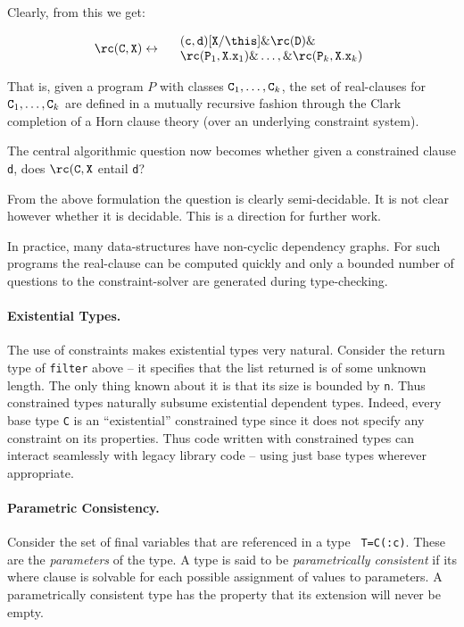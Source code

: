 \noindent Clearly, from this we get:

$$\rc({\tt C},{\tt X}) \leftrightarrow 
\begin{array}{l}
\quad ({\tt c},{\tt d})[{\tt X}/\this] \&   \rc({\tt D}) \& \\
\quad \rc({\tt P}_1, {\tt X.x}_1)\& \ldots, \& \rc({\tt P}_k, {\tt X.x}_k)
\end{array}
$$
  
That is, given a program $P$ with classes ${\tt C}_1,\ldots, {\tt
C}_k$, the set of real-clauses for ${\tt C}_1,\ldots, {\tt C}_k$ are
defined in a mutually recursive fashion through the Clark completion
of a Horn clause theory (over an underlying constraint system).

The central algorithmic question now becomes whether given a
constrained clause {\tt d}, does $\rc({\tt C},{\tt X}$ entail {\tt d}? 

From the above formulation the question is clearly semi-decidable. It
is not clear however whether it is decidable. This is a direction for
further work.

In practice, many data-structures have non-cyclic dependency
graphs. For such programs the real-clause can be computed quickly and
only a bounded number of questions to the constraint-solver are
generated during type-checking.

\paragraph{Existential Types.}
The use of constraints makes existential types very natural.  Consider
the return type of {\tt filter} above -- it specifies that the list
returned is of some unknown length. The only thing known about it is
that its size is bounded by {\tt n}. Thus constrained types naturally
subsume existential dependent types. Indeed, every base type {\tt C}
is an ``existential'' constrained type since it does not specify any
constraint on its properties. Thus code written with constrained types
can interact seamlessly with legacy library code -- using just base
types wherever appropriate.

\paragraph{Parametric Consistency.}
Consider the set of final variables that are referenced in a type {\tt
T=C(:c)}. These are the {\em parameters} of the type. A type is said
to be {\em parametrically consistent} if its where clause is solvable
for each possible assignment of values to parameters.  A
parametrically consistent type has the property that its extension
will never be empty. 


